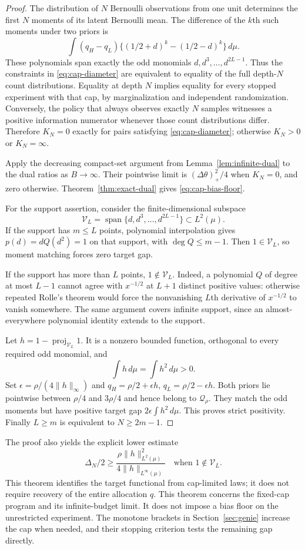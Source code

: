\begin{proof}
The distribution of $N$ Bernoulli observations from one unit determines
the first $N$ moments of its latent Bernoulli mean. The difference of the
$k$th such moments under two priors is
\[
 \int(q_H-q_L)
       \{(1/2+d)^k-(1/2-d)^k\}\,d\mu.
\]
These polynomials span exactly the odd monomials
$d,d^3,\ldots,d^{2L-1}$. Thus the constraints in
\eqref{eq:cap-diameter} are equivalent to equality of the full depth-$N$
count distributions. Equality at depth $N$ implies equality for every
stopped experiment with that cap, by marginalization and independent
randomization. Conversely, the policy that always observes exactly $N$
samples witnesses a positive information numerator whenever those count
distributions differ. Therefore $K_N=0$ exactly for pairs satisfying
\eqref{eq:cap-diameter}; otherwise $K_N>0$ or $K_N=\infty$.

Apply the decreasing compact-set argument from
Lemma~\ref{lem:infinite-dual} to the dual ratios as $B\to\infty$.
Their pointwise limit is $(\Delta\theta)_+^2/4$ when $K_N=0$, and zero
otherwise. Theorem~\ref{thm:exact-dual} gives
\eqref{eq:cap-bias-floor}.

For the support assertion, consider the finite-dimensional subspace
\[
 \mathcal V_L=\operatorname{span}\{d,d^3,\ldots,d^{2L-1}\}
 \subset L^2(\mu).
\]
If the support has $m\le L$ points, polynomial interpolation gives
$p(d)=dQ(d^2)=1$ on that support, with $\deg Q\le m-1$.
Then $1\in\mathcal V_L$, so moment matching forces zero target gap.

If the support has more than $L$ points, $1\notin\mathcal V_L$.
Indeed, a polynomial $Q$ of degree at most $L-1$ cannot agree with
$x^{-1/2}$ at $L+1$ distinct positive values: otherwise repeated Rolle's
theorem would force the nonvanishing $L$th derivative of $x^{-1/2}$ to
vanish somewhere. The same argument covers infinite support, since an
almost-everywhere polynomial identity extends to the support.

Let $h=1-\operatorname{proj}_{\mathcal V_L}1$. It is a nonzero bounded
function, orthogonal to every required odd monomial, and
\[
 \int h\,d\mu=\int h^2\,d\mu>0.
\]
Set $\epsilon=\rho/(4\|h\|_\infty)$ and
$q_H=\rho/2+\epsilon h$, $q_L=\rho/2-\epsilon h$.
Both priors lie pointwise between $\rho/4$ and $3\rho/4$ and hence
belong to $\mathcal Q_\rho$. They match the odd moments but have positive
target gap $2\epsilon\int h^2\,d\mu$. This proves strict positivity.
Finally $L\ge m$ is equivalent to $N\ge2m-1$.
\end{proof}

The proof also yields the explicit lower estimate
\[
 \Delta_N/2\ge
 \frac{\rho\|h\|_{L^2(\mu)}^2}{4\|h\|_{L^\infty(\mu)}}
 \quad\text{when }1\notin\mathcal V_L.
\]
This theorem identifies the target functional from cap-limited laws;
it does not require recovery of the entire allocation $q$.
This theorem concerns the fixed-cap program and its infinite-budget limit.
It does not impose a bias floor on the unrestricted experiment. The
monotone brackets in Section~\ref{sec:genie} increase the cap when needed,
and their stopping criterion tests the remaining gap directly.
